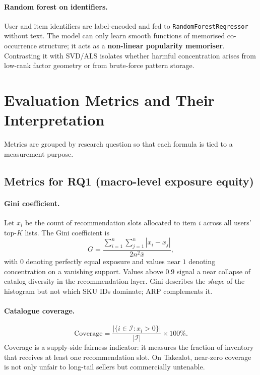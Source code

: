 \paragraph{Random forest on identifiers.}
User and item identifiers are label-encoded and fed to \texttt{RandomForestRegressor} without text. The model can only learn smooth functions of memorised co-occurrence structure; it acts as a \textbf{non-linear popularity memoriser}. Contrasting it with SVD/ALS isolates whether harmful concentration arises from low-rank factor geometry or from brute-force pattern storage.

\section{Evaluation Metrics and Their Interpretation}
\label{sec:method_metrics}

Metrics are grouped by research question so that each formula is tied to a measurement purpose.

\subsection{Metrics for RQ1 (macro-level exposure equity)}
\label{sec:method_metrics_rq1}

\paragraph{Gini coefficient.}
Let $x_i$ be the count of recommendation slots allocated to item $i$ across all users' top-$K$ lists. The Gini coefficient \citep{cowell2011measuring, celma2008novel} is
\begin{equation}
  G = \frac{\sum_{i=1}^{n}\sum_{j=1}^{n}|x_i - x_j|}{2n^2\bar{x}},
\end{equation}
with $0$ denoting perfectly equal exposure and values near $1$ denoting concentration on a vanishing support. Values above $0.9$ signal a near collapse of catalog diversity in the recommendation layer. Gini describes the \emph{shape} of the histogram but not which SKU IDs dominate; ARP complements it.

\paragraph{Catalogue coverage.}
\begin{equation}
  \textrm{Coverage} = \frac{|\{i \in \mathcal{I} : x_i>0\}|}{|\mathcal{I}|}\times 100\%.
\end{equation}
Coverage is a supply-side fairness indicator: it measures the fraction of inventory that receives at least one recommendation slot. On Takealot, near-zero coverage is not only unfair to long-tail sellers but commercially untenable.

